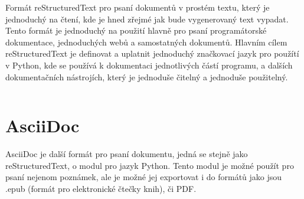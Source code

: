 Formát reStructuredText pro psaní dokumentů v prostém textu, který je jednoduchý na čtení, kde je hned zřejmé jak bude vygenerovaný text vypadat.
Tento formát je jednoduchý na použití hlavně pro psaní programátorské dokumentace, jednoduchých webů a samostatných dokumentů.
Hlavním cílem reStructuredText je definovat a uplatnit jednoduchý značkovací jazyk pro použítí v Python, kde se používá k dokumentaci jednotlivých částí programu,
a dalších dokumentačních nástrojích, který je jednoduše čitelný a jednoduše použitelný. \cite{reStruDoc}

\inputminted{rst}{example-rst.rst}



\section{AsciiDoc}

AsciiDoc je další formát pro psaní dokumentu, jedná se stejně jako reStructuredText, o modul pro jazyk Python. Tento modul je možné použít pro psaní nejenom poznámek,
ale je možné jej exportovat i do formátů jako jsou .epub (formát pro elektronické čtečky knih), či PDF. \cite{asciDoc}